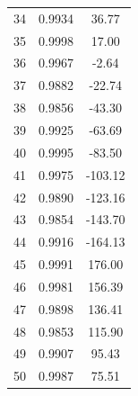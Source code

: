\begin{longtable}{ccc}
34 & 0.9934 & 36.77 \\
35 & 0.9998 & 17.00 \\
36 & 0.9967 & -2.64 \\
37 & 0.9882 & -22.74 \\
38 & 0.9856 & -43.30 \\
39 & 0.9925 & -63.69 \\
40 & 0.9995 & -83.50 \\
41 & 0.9975 & -103.12 \\
42 & 0.9890 & -123.16 \\
43 & 0.9854 & -143.70 \\
44 & 0.9916 & -164.13 \\
45 & 0.9991 & 176.00 \\
46 & 0.9981 & 156.39 \\
47 & 0.9898 & 136.41 \\
48 & 0.9853 & 115.90 \\
49 & 0.9907 & 95.43 \\
50 & 0.9987 & 75.51 \\
\end{longtable}
